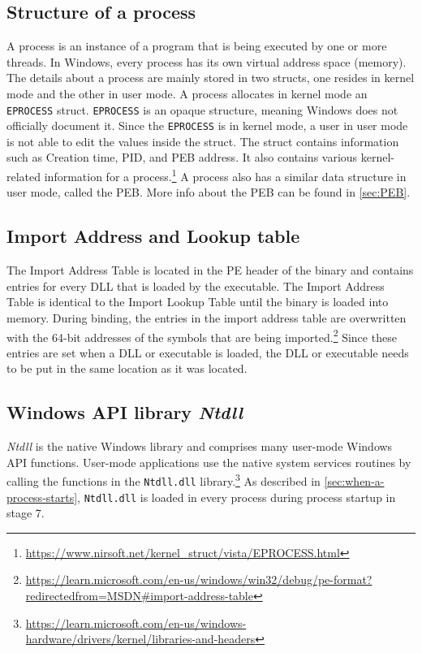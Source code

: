 \documentclass[a4paper, 11pt, english]{report}
\begin{document}
\subsection{Structure of a process}
\label{sec:process-structure}
A process is an instance of a program that is being executed by one or more threads. In Windows, every process has its own virtual address space (memory). The details about a process are mainly stored in two structs, one resides in kernel mode and the other in user mode.  
A process allocates in kernel mode an \texttt{EPROCESS} struct. \texttt{EPROCESS} is an opaque structure, meaning Windows does not officially document it. Since the \texttt{EPROCESS} is in kernel mode, a user in user mode is not able to edit the values inside the struct. The struct contains information such as Creation time, PID, and PEB address. It also contains various kernel-related information for a process.\footnote{\url{https://www.nirsoft.net/kernel_struct/vista/EPROCESS.html}}
A process also has a similar data structure in user mode, called the PEB. More info about the PEB can be found in \autoref{sec:PEB}.

\subsection{Import Address and Lookup table}
The Import Address Table is located in the PE header of the binary and contains entries for every DLL that is loaded by the executable. The Import Address Table is identical to the Import Lookup Table until the binary is loaded into memory. During binding, the entries in the import address table are overwritten with the 64-bit addresses of the symbols that are being imported.\footnote{\url{https://learn.microsoft.com/en-us/windows/win32/debug/pe-format?redirectedfrom=MSDN\#import-address-table}} Since these entries are set when a DLL or executable is loaded, the DLL or executable needs to be put in the same location as it was located.

\subsection{Windows API library \textit{Ntdll}}
\textit{Ntdll} is the native Windows library and comprises many user-mode Windows API functions. User-mode applications use the native system services routines by calling the functions in the \texttt{Ntdll.dll} library.\footnote{\url{https://learn.microsoft.com/en-us/windows-hardware/drivers/kernel/libraries-and-headers}} As described in \autoref{sec:when-a-process-starts}, \texttt{Ntdll.dll} is loaded in every process during process startup in stage 7.
\end{document}
